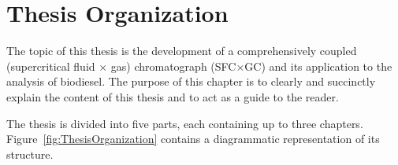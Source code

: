 \setcounter{chapter}{-1}%

\chapter{Thesis Organization} %

\label{Chapter0} %

The topic of this thesis is the development of a comprehensively coupled
(supercritical fluid × gas) chromatograph (SFC×GC) and its application to the
analysis of biodiesel. The purpose of this chapter is to clearly and succinctly
explain the content of this thesis and to act as a guide to the reader.

The thesis is divided into five parts, each containing up to three chapters.
Figure~\ref{fig:ThesisOrganization} contains a diagrammatic representation of
its structure.

